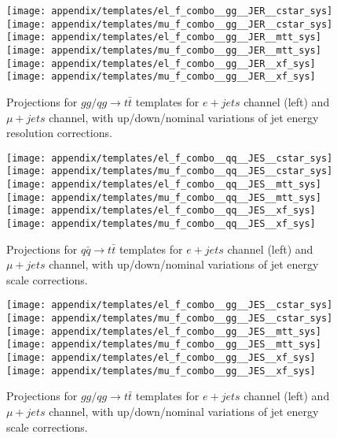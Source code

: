 \documentclass{cmspaperpdf}
\begin{document}
\begin{figure}[hbt]
  \begin{center}
    \texttt{[image: appendix/templates/el\_f\_combo\_\_gg\_\_JER\_\_cstar\_sys]}
    \texttt{[image: appendix/templates/mu\_f\_combo\_\_gg\_\_JER\_\_cstar\_sys]}    
    \texttt{[image: appendix/templates/el\_f\_combo\_\_gg\_\_JER\_\_mtt\_sys]}
    \texttt{[image: appendix/templates/mu\_f\_combo\_\_gg\_\_JER\_\_mtt\_sys]}
    \texttt{[image: appendix/templates/el\_f\_combo\_\_gg\_\_JER\_\_xf\_sys]}
    \texttt{[image: appendix/templates/mu\_f\_combo\_\_gg\_\_JER\_\_xf\_sys]}
  \caption{\small Projections for $gg/qg \rightarrow t\bar t$ templates for $e+jets$ channel (left) and $\mu+jets$ channel, with up/down/nominal variations of jet energy resolution corrections.}
  \label{appendix:JER gg temp}
  \end{center}
\end{figure}

\begin{figure}[hbt]
  \begin{center}
    \texttt{[image: appendix/templates/el\_f\_combo\_\_qq\_\_JES\_\_cstar\_sys]}
    \texttt{[image: appendix/templates/mu\_f\_combo\_\_qq\_\_JES\_\_cstar\_sys]}    
    \texttt{[image: appendix/templates/el\_f\_combo\_\_qq\_\_JES\_\_mtt\_sys]}
    \texttt{[image: appendix/templates/mu\_f\_combo\_\_qq\_\_JES\_\_mtt\_sys]}
    \texttt{[image: appendix/templates/el\_f\_combo\_\_qq\_\_JES\_\_xf\_sys]}
    \texttt{[image: appendix/templates/mu\_f\_combo\_\_qq\_\_JES\_\_xf\_sys]}
  \caption{\small Projections for $q\bar q \rightarrow t\bar t$  templates for $e+jets$ channel (left) and $\mu+jets$ channel, with up/down/nominal variations of jet energy scale corrections.}
  \label{appendix:JES qq temp}
  \end{center}
\end{figure}

\begin{figure}[hbt]
  \begin{center}
    \texttt{[image: appendix/templates/el\_f\_combo\_\_gg\_\_JES\_\_cstar\_sys]}
    \texttt{[image: appendix/templates/mu\_f\_combo\_\_gg\_\_JES\_\_cstar\_sys]}    
    \texttt{[image: appendix/templates/el\_f\_combo\_\_gg\_\_JES\_\_mtt\_sys]}
    \texttt{[image: appendix/templates/mu\_f\_combo\_\_gg\_\_JES\_\_mtt\_sys]}
    \texttt{[image: appendix/templates/el\_f\_combo\_\_gg\_\_JES\_\_xf\_sys]}
    \texttt{[image: appendix/templates/mu\_f\_combo\_\_gg\_\_JES\_\_xf\_sys]}
  \caption{\small Projections for $gg/qg \rightarrow t\bar t$ templates for $e+jets$ channel (left) and $\mu+jets$ channel, with up/down/nominal variations of jet energy scale corrections.}
  \label{appendix:JES gg temp}
  \end{center}
\end{figure}
\end{document}
